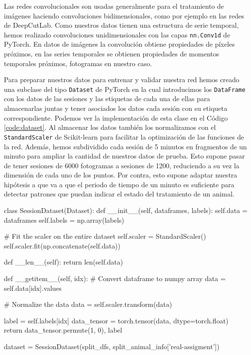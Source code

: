 Las redes convolucionales son usadas generalmente para el tratamiento de imágenes haciendo convoluciones bidimensionales, como por ejemplo en las redes de DeepCutLab. Como nuestros datos tienen una estructura de serie temporal, hemos realizado convoluciones unidimensionales con las capas \texttt{nn.Conv1d} de PyTorch. En datos de imágenes la convolución obtiene propiedades de píxeles próximos, en las series temporales se obtienen propiedades de momentos temporales próximos, fotogramas en nuestro caso.

Para preparar nuestros datos para entrenar y validar nuestra red hemos creado una subclase del tipo \texttt{Dataset} de PyTorch en la cual introducimos los \texttt{DataFrame} con los datos de las sesiones y las etiquetas de cada una de ellas para almacenarlas juntas y tener asociados los datos cada sesión con su etiqueta correspondiente. Podemos ver la implementación de esta clase en el Código \ref{code:dataset}. Al almacenar los datos también los normalizamos con el \texttt{StandardScaler} de Scikit-learn para facilitar la optimización de las funciones de la red. Además, hemos subdividido cada sesión de 5 minutos en fragmentos de un minuto para ampliar la cantidad de nuestros datos de prueba. Esto supone pasar de tener sesiones de 6000 fotogramas a sesiones de 1200, reduciendo a su vez la dimensión de cada uno de los puntos. Por contra, esto supone adaptar nuestra hipótesis a que va a que el periodo de tiempo de un minuto es suficiente para detectar patrones que puedan indicar el estado del tratamiento de un animal.

\begin{mypython}[float={h}, caption=\texttt{Dataset} de las sesiones, label={code:dataset}]
class SessionDataset(Dataset):
  def __init__(self, dataframes, labels):
    self.data = dataframes
    self.labels = np.array(labels)
    
    # Fit the scaler on the entire dataset
    self.scaler = StandardScaler()
    self.scaler.fit(np.concatenate(self.data))  

  def __len__(self):
    return len(self.data)

  def __getitem__(self, idx):
    # Convert dataframe to numpy array
    data = self.data[idx].values 

    # Normalize the data
    data = self.scaler.transform(data)

    label = self.labels[idx]
    data_tensor = torch.tensor(data, dtype=torch.float)
    return data_tensor.permute(1, 0), label

dataset = SessionDataset(split_dfs,
                         split_animal_info['real-assigment'])
\end{mypython}

